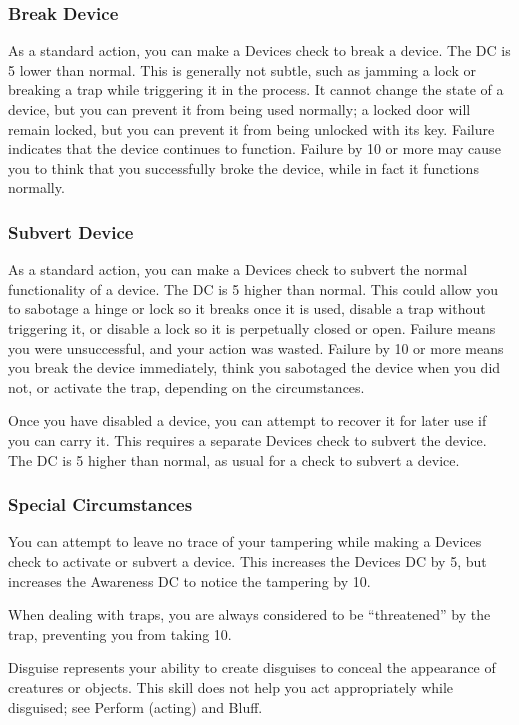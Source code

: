 \subsubsection{Break Device}
As a standard action, you can make a Devices check to break a device. The DC is 5 lower than normal. This is generally not subtle, such as jamming a lock or breaking a trap while triggering it in the process. It cannot change the state of a device, but you can prevent it from being used normally; a locked door will remain locked, but you can prevent it from being unlocked with its key. Failure indicates that the device continues to function. Failure by 10 or more may cause you to think that you successfully broke the device, while in fact it functions normally.

\subsubsection{Subvert Device}
As a standard action, you can make a Devices check to subvert the normal functionality of a device. The DC is 5 higher than normal. This could allow you to sabotage a hinge or lock so it breaks once it is used, disable a trap without triggering it, or disable a lock so it is perpetually closed or open. Failure means you were unsuccessful, and your action was wasted. Failure by 10 or more means you break the device immediately, think you sabotaged the device when you did not, or activate the trap, depending on the circumstances.

Once you have disabled a device, you can attempt to recover it for later use if you can carry it. This requires a separate Devices check to subvert the device. The DC is 5 higher than normal, as usual for a check to subvert a device.

\subsubsection{Special Circumstances}

You can attempt to leave no trace of your tampering while making a Devices check to activate or subvert a device. This increases the Devices DC by 5, but increases the Awareness DC to notice the tampering by 10.

When dealing with traps, you are always considered to be ``threatened'' by the trap, preventing you from taking 10.

Disguise represents your ability to create disguises to conceal the appearance of creatures or objects. This skill does not help you act appropriately while disguised; see Perform (acting) and Bluff.

